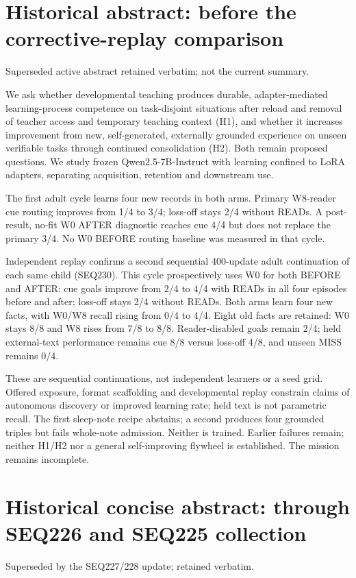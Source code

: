 \documentclass[11pt]{article}
\begin{document}
\section*{Historical abstract: before the corrective-replay comparison}
\noindent Superseded active abstract retained verbatim; not the current summary.

We ask whether developmental teaching produces durable, adapter-mediated
learning-process competence on task-disjoint situations after reload and
removal of teacher access and temporary teaching context (H1), and whether it
increases improvement from new, self-generated, externally grounded experience
on unseen verifiable tasks through continued consolidation (H2). Both remain
proposed questions. We study frozen Qwen2.5-7B-Instruct with learning confined
to LoRA adapters, separating acquisition, retention and downstream use.

The first adult cycle learns four new records in both arms. Primary W8-reader
cue routing improves from 1/4 to 3/4; loss-off stays 2/4 without READs. A
post-result, no-fit W0 AFTER diagnostic reaches cue 4/4 but does not replace
the primary 3/4. No W0 BEFORE routing baseline was measured in that cycle.

Independent replay confirms a second sequential 400-update adult continuation
of each same child (SEQ230). This cycle
prospectively uses W0 for both BEFORE and AFTER: cue goals improve from 2/4
to 4/4 with READs in all four episodes before and after; loss-off stays 2/4
without READs. Both arms learn four new facts, with W0/W8 recall rising from
0/4 to 4/4. Eight old facts are retained: W0 stays 8/8 and W8 rises from
7/8 to 8/8. Reader-disabled goals remain 2/4; held external-text performance
remains cue 8/8 versus loss-off 4/8, and unseen MISS remains 0/4.

These are sequential continuations, not independent learners or a seed grid.
Offered exposure, format scaffolding and developmental replay constrain claims
of autonomous discovery or improved learning rate; held text is not parametric
recall. The first sleep-note recipe abstains; a second produces four grounded
triples but fails whole-note admission. Neither is trained. Earlier failures remain; neither H1/H2 nor
a general self-improving flywheel is established. The mission remains incomplete.

\section*{Historical concise abstract: through SEQ226 and SEQ225 collection}
\noindent Superseded by the SEQ227/228 update; retained verbatim.
\end{document}
